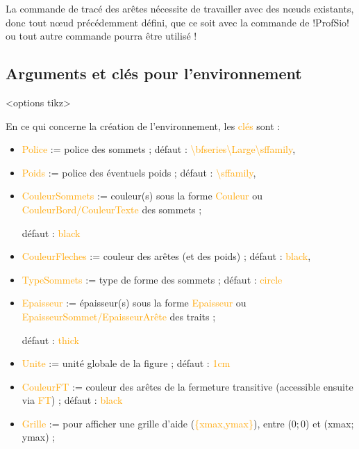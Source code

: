 \documentclass[french,a4paper,11pt]{article}
\newcommand\Cle[1]{{\small\sffamily\textlangle \textcolor{orange}{#1}\textrangle}}
\begin{document}
{{\begin{tipblock}
La commande de tracé des arêtes nécessite de travailler avec des nœuds existants, donc tout nœud précédemment défini, que ce soit avec la commande de \packagetex!ProfSio! ou tout autre commande pourra être utilisé !
\end{tipblock}

\subsection{Arguments et clés pour l'environnement}

\begin{DemoCode}
\begin{GrapheTikz}[clés]<options tikz>
\end{GrapheTikz}
\end{DemoCode}

\begin{tipblock}
En ce qui concerne la création de l'environnement, les \Cle{clés} sont :

\begin{itemize}
	\item \Cle{Police} := police des sommets ; \hfill{}défaut : \Cle{\textbackslash bfseries\textbackslash Large\textbackslash sffamily},%
	\item \Cle{Poids} := police des éventuels poids ; \hfill{}défaut : \Cle{\textbackslash sffamily},%
	\item \Cle{CouleurSommets} := couleur(s) sous la forme \Cle{Couleur} ou \Cle{CouleurBord/CouleurTexte} des sommets ;

	\hfill{}défaut : \Cle{black}
	\item \Cle{CouleurFleches} := couleur des arêtes (et des poids) ; \hfill{}défaut : \Cle{black},%
	\item \Cle{TypeSommets} := type de forme des sommets ; \hfill{}défaut : \Cle{circle}
	\item \Cle{Epaisseur} := épaisseur(s) sous la forme \Cle{Epaisseur} ou \Cle{EpaisseurSommet/EpaisseurArête} des traits ;

	\hfill{}défaut : \Cle{thick}
	\item \Cle{Unite} := unité globale de la figure ; \hfill{}défaut : \Cle{1cm}
	\item \Cle{CouleurFT} := couleur des arêtes de la fermeture transitive (accessible ensuite via \Cle{FT}) ; \hfill{}défaut : \Cle{black}
	\item \Cle{Grille} := pour afficher une grille d'aide (\Cle{\{xmax,ymax\}}), entre (0;\,0) et (xmax;\,ymax) ;


\end{itemize}
\end{tipblock}}}
\end{document}
